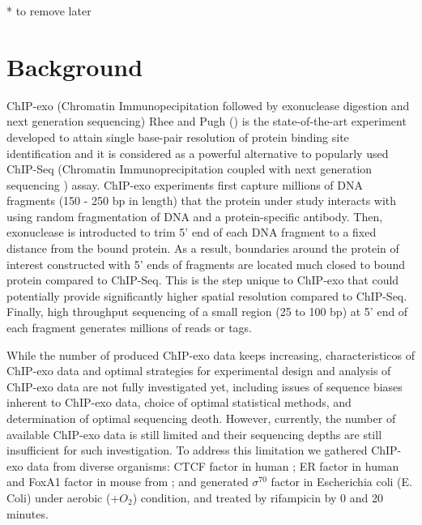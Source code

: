 \documentclass{bmcart}\usepackage[]{graphicx}\usepackage[]{color}
\begin{document}
\newpage

* to remove later

\tableofcontents


\newpage

\section{Background}
\label{sec:intro}

ChIP-exo (Chromatin Immunopecipitation followed by exonuclease
digestion and next generation sequencing) Rhee and Pugh (\cite{exo1})
is the state-of-the-art experiment developed to attain single
base-pair resolution of protein binding site identification and it is
considered as a powerful alternative to popularly used ChIP-Seq
(Chromatin Immunoprecipitation coupled with next generation sequencing
) assay. ChIP-exo experiments first capture millions of DNA fragments
(150 - 250 bp in length) that the protein under study interacts with
using random fragmentation of DNA and a protein-specific
antibody. Then, exonuclease is introducted to trim 5' end of each DNA
fragment to a fixed distance from the bound protein. As a result,
boundaries around the protein of interest constructed with 5' ends of
fragments are located much closed to bound protein compared to
ChIP-Seq. This is the step unique to ChIP-exo that could potentially
provide significantly higher spatial resolution compared to
ChIP-Seq. Finally, high throughput sequencing of a small region (25 to
100 bp) at 5' end of each fragment generates millions of reads or
tags.

While the number of produced ChIP-exo data keeps increasing,
characteristicos of ChIP-exo data and optimal strategies for
experimental design and analysis of ChIP-exo data are not fully
investigated yet, including issues of sequence biases inherent to
ChIP-exo data, choice of optimal statistical methods, and
determination of optimal sequencing deoth. However, currently, the
number of available ChIP-exo data is still limited and their
sequencing depths are still insufficient for such investigation. To
address this limitation we gathered ChIP-exo data from diverse
organisms: CTCF factor in human \cite{exo1}; ER factor in human and
FoxA1 factor in mouse from \cite{exoillumina}; and generated
$\sigma^{70}$ factor in Escherichia coli (E. Coli) under aerobic ($ +
O_2$) condition, and treated by rifampicin by 0 and 20 minutes.
\end{document}
